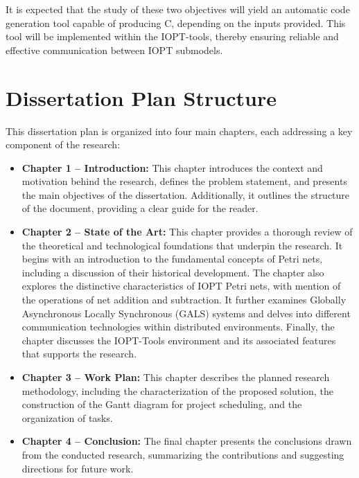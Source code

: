 It is expected that the study of these two objectives will yield an automatic code generation tool capable of producing C, depending on the inputs provided. This tool will be implemented within the IOPT-tools, thereby ensuring reliable and effective communication between IOPT submodels.





\section{Dissertation Plan Structure}
\label{sec:dissertation_structure}


This dissertation plan is organized into four main chapters, each addressing a key component of the research:

\begin{itemize}
    \item \textbf{Chapter 1 – Introduction:}  
    This chapter introduces the context and motivation behind the research, defines the problem statement, and presents the main objectives of the dissertation. Additionally, it outlines the structure of the document, providing a clear guide for the reader.

   \item \textbf{Chapter 2 – State of the Art:}  
This chapter provides a thorough review of the theoretical and technological foundations that underpin the research. It begins with an introduction to the fundamental concepts of Petri nets, including a discussion of their historical development. The chapter also explores the distinctive characteristics of IOPT Petri nets, with mention of the operations of net addition and subtraction. It further examines Globally Asynchronous Locally Synchronous (GALS) systems and delves into different communication technologies within distributed environments. Finally, the chapter discusses the IOPT-Tools environment and its associated features that supports the research.

    \item \textbf{Chapter 3 – Work Plan:}  
    This chapter describes the planned research methodology, including the characterization of the proposed solution, the construction of the Gantt diagram for project scheduling, and the organization of tasks.

    \item \textbf{Chapter 4 – Conclusion:}  
    The final chapter presents the conclusions drawn from the conducted research, summarizing the contributions and suggesting directions for future work.
\end{itemize}


